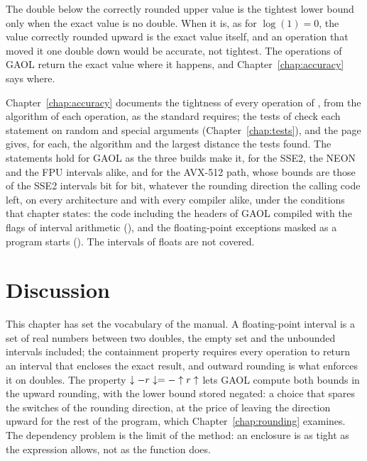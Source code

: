 \documentclass[12pt,a4paper,twoside,openright]{book}
\begin{document}
\begin{Rem}\label{rem:exact-value}
The double below the correctly rounded upper value is the tightest lower
bound only when the exact value is no double. When it is, as for
$\log(1)=0$, the value correctly rounded upward is the exact value itself,
and an operation that moved it one double down would be accurate, not
tightest. The operations of GAOL return the exact value where it happens,
and Chapter~\ref{chap:accuracy} says where.
\end{Rem}

\medskip
Chapter~\ref{chap:accuracy} documents the tightness of every operation of
, from the algorithm of each operation, as the standard
requires; the tests of  check each statement on random and
special arguments (Chapter~\ref{chap:tests}), and the page 
gives, for each, the algorithm and the largest distance the tests
found.\newinvfive{} The statements hold for GAOL as the three builds make
it, for the SSE2, the NEON and the FPU intervals alike, and for the AVX-512
path, whose bounds are those of the SSE2 intervals bit for bit, whatever the rounding
direction the calling code left, on every architecture and with every
compiler alike, under the conditions that chapter states: the code
including the headers of GAOL compiled with the flags of interval
arithmetic (), and the floating-point exceptions
masked as a program starts (). The intervals of
floats are not covered.

\section{Discussion}\label{sec:concepts-discussion}

This chapter has set the vocabulary of the manual. A floating-point
interval is a set of real numbers between two doubles, the empty set and
the unbounded intervals included; the containment property requires every
operation to return an interval that encloses the exact result, and
outward rounding is what enforces it on doubles. The property
$\downarrow-r\downarrow=-\uparrow r\uparrow$ lets GAOL compute both bounds in the upward
rounding, with the lower bound stored negated: a choice that spares the
switches of the rounding direction, at the price of leaving the direction
upward for the rest of the program, which Chapter~\ref{chap:rounding}
examines. The dependency problem is the limit of the method: an enclosure
is as tight as the expression allows, not as the function does.
\end{document}
